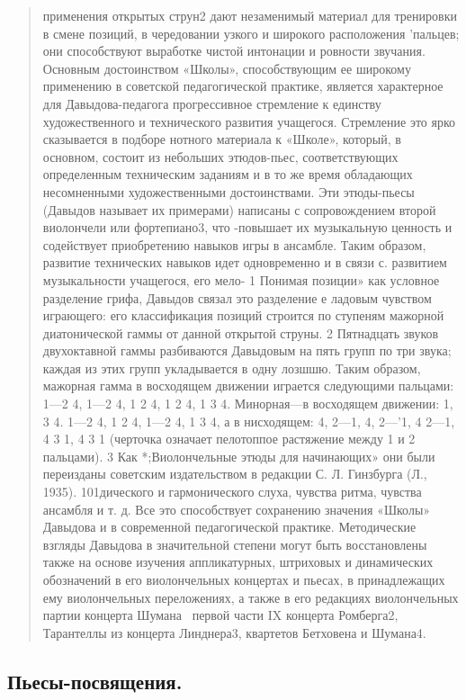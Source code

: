\documentclass[12pt,a4paper,oneside,titlepage,draft]{extreport}
\begin{document}
\begin{quotation}
применения открытых струн2 дают незаменимый материал
для тренировки в смене позиций, в чередовании узкого и 
широкого расположения 'пальцев; они способствуют выработке
чистой интонации и ровности звучания.
Основным достоинством «Школы», способствующим ее
широкому применению в советской педагогической практике,
является характерное для Давыдова-педагога прогрессивное
стремление к единству художественного и 
технического развития учащегося. Стремление это
ярко сказывается в подборе нотного материала к «Школе»,
который, в основном, состоит из небольших этюдов-пьес, 
соответствующих определенным техническим заданиям и в то
же время обладающих несомненными художественными 
достоинствами. Эти этюды-пьесы (Давыдов называет их 
примерами) написаны с сопровождением второй виолончели или
фортепиано3, что -повышает их музыкальную ценность и
содействует приобретению навыков игры в ансамбле. Таким
образом, развитие технических навыков идет одновременно
и в связи с. развитием музыкальности учащегося, его мело-
1 Понимая позиции» как условное разделение грифа, Давыдов связал это разделение е ладовым чувством играющего: его классификация
позиций строится по ступеням мажорной диатонической гаммы от данной
открытой струны.
2 Пятнадцать звуков двухоктавной гаммы разбиваются Давыдовым
на пять групп по три звука; каждая из этих групп укладывается в одну
лозшшю. Таким образом, мажорная гамма в восходящем движении 
играется следующими пальцами: 1—2 4, 1—2 4, 1 2 4, 1 2 4, 1 3 4. 
Минорная—в восходящем движении: 1, 3 4. 1—2 4, 1 2 4, 1—2 4, 1 3 4, а в
нисходящем: 4, 2—1, 4, 2—'1, 4 2—1, 4 3 1, 4 3 1 (черточка означает
пелотоппое растяжение между 1 и 2 пальцами).
3 Как *;Виолончельные этюды для начинающих» они были переизданы
советским издательством в редакции С. Л. Гинзбурга (Л., 1935).
101дического и гармонического слуха, чувства ритма, чувства
ансамбля и т. д.
Все это способствует сохранению значения «Школы»
Давыдова и в современной педагогической практике.
Методические взгляды Давыдова в значительной степени
могут быть восстановлены также на основе изучения 
аппликатурных, штриховых и динамических обозначений в его
виолончельных концертах и пьесах, в принадлежащих ему
виолончельных переложениях, а также в его редакциях
виолончельных партии концерта Шумана \ первой части IX
концерта Ромберга2, Тарантеллы из концерта Линднера3,
квартетов Бетховена и Шумана4.
		\end{quotation}
		
		\subsection*{Пьесы-посвящения.}
		
\end{document}
